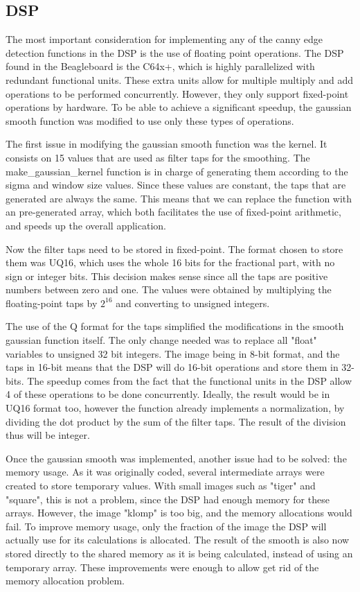 \subsection{DSP}
The most important consideration for implementing any of the canny edge detection functions in the DSP is the use of floating point operations. The DSP found in the Beagleboard is the C64x+, which is highly parallelized with redundant functional units. These extra units allow for multiple multiply and add operations to be performed concurrently. However, they only support fixed-point operations by hardware. To be able to achieve a significant speedup, the gaussian smooth function was modified to use only these types of operations.

The first issue in modifying the gaussian smooth function was the kernel. It consists on 15 values that are used as filter taps for the smoothing. The make\_gaussian\_kernel function is in charge of generating them according to the sigma and window size values. Since these values are constant, the taps that are generated are always the same. This means that we can replace the function with an pre-generated array, which both facilitates the use of fixed-point arithmetic, and speeds up the overall application.

Now the filter taps need to be stored in fixed-point. The format chosen to store them was UQ16, which uses the whole 16 bits for the fractional part, with no sign or integer bits. This decision makes sense since all the taps are positive numbers between zero and one. The values were obtained by multiplying the floating-point taps by $2^{16}$ and converting to unsigned integers.

The use of the Q format for the taps simplified the modifications in the smooth gaussian function itself. The only change needed was to replace all "float" variables to unsigned 32 bit integers. The image being in 8-bit format, and the taps in 16-bit means that the DSP will do 16-bit operations and store them in 32-bits.  The speedup comes from the fact that the functional units in the DSP allow 4 of these operations to be done concurrently. Ideally, the result would be in UQ16 format too, however the function already implements a normalization, by dividing the dot product by the sum of the filter taps. The result of the division thus will be integer.

Once the gaussian smooth was implemented, another issue had to be solved: the memory usage. As it was originally coded, several intermediate arrays were created to store temporary values. With small images such as "tiger" and "square", this is not a problem, since the DSP had enough memory for these arrays. However, the image "klomp" is too big, and the memory allocations would fail. To improve memory usage, only the fraction of the image the DSP will actually use for its calculations is allocated. The result of the smooth is also now stored directly to the shared memory as it is being calculated, instead of using an temporary array. These improvements were enough to allow get rid of the memory allocation problem.